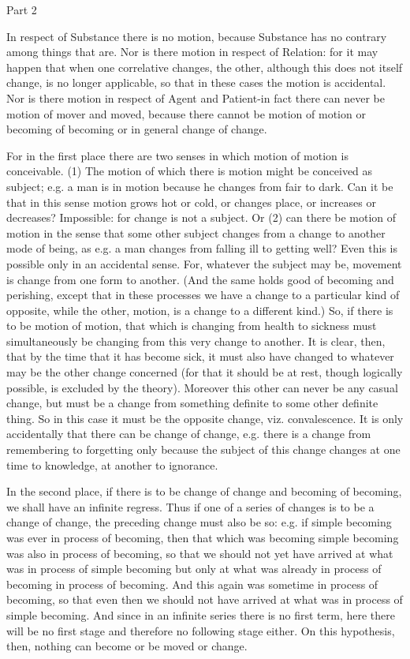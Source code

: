Part 2

In respect of Substance there is no motion, because Substance has
no contrary among things that are. Nor is there motion in respect
of Relation: for it may happen that when one correlative changes,
the other, although this does not itself change, is no longer applicable,
so that in these cases the motion is accidental. Nor is there motion
in respect of Agent and Patient-in fact there can never be motion
of mover and moved, because there cannot be motion of motion or becoming
of becoming or in general change of change. 

For in the first place there are two senses in which motion of motion
is conceivable. (1) The motion of which there is motion might be conceived
as subject; e.g. a man is in motion because he changes from fair to
dark. Can it be that in this sense motion grows hot or cold, or changes
place, or increases or decreases? Impossible: for change is not a
subject. Or (2) can there be motion of motion in the sense that some
other subject changes from a change to another mode of being, as e.g.
a man changes from falling ill to getting well? Even this is possible
only in an accidental sense. For, whatever the subject may be, movement
is change from one form to another. (And the same holds good of becoming
and perishing, except that in these processes we have a change to
a particular kind of opposite, while the other, motion, is a change
to a different kind.) So, if there is to be motion of motion, that
which is changing from health to sickness must simultaneously be changing
from this very change to another. It is clear, then, that by the time
that it has become sick, it must also have changed to whatever may
be the other change concerned (for that it should be at rest, though
logically possible, is excluded by the theory). Moreover this other
can never be any casual change, but must be a change from something
definite to some other definite thing. So in this case it must be
the opposite change, viz. convalescence. It is only accidentally that
there can be change of change, e.g. there is a change from remembering
to forgetting only because the subject of this change changes at one
time to knowledge, at another to ignorance. 

In the second place, if there is to be change of change and becoming
of becoming, we shall have an infinite regress. Thus if one of a series
of changes is to be a change of change, the preceding change must
also be so: e.g. if simple becoming was ever in process of becoming,
then that which was becoming simple becoming was also in process of
becoming, so that we should not yet have arrived at what was in process
of simple becoming but only at what was already in process of becoming
in process of becoming. And this again was sometime in process of
becoming, so that even then we should not have arrived at what was
in process of simple becoming. And since in an infinite series there
is no first term, here there will be no first stage and therefore
no following stage either. On this hypothesis, then, nothing can become
or be moved or change. 

